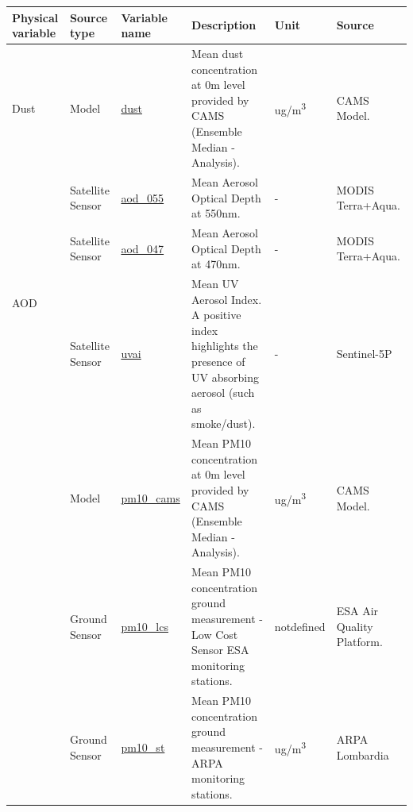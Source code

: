 \begin{center}
\setlength{\arrayrulewidth}{1.5pt}
\begin{longtable}{ |p{2.3cm}|p{1.5cm}|p{2.3cm}|p{4cm}|p{1.2cm}|p{2.3cm}| } 
\hline
\textbf{Physical variable} & \textbf{Source type}  & \textbf{Variable name}  & \textbf{Description}  & \textbf{Unit}  & \textbf{Source}\\ 
\hline
\multirow{1}{4em}{Dust} & Model  & \underline{dust} & Mean dust concentration at 0m level provided by CAMS (Ensemble Median - Analysis).\par & ug/m\textsuperscript{3} & CAMS Model.\\ \hline

\multirow{3}{4em}{AOD} & Satellite \newline Sensor  & \underline{aod\_055} & Mean Aerosol Optical Depth at 550nm.\par & - & MODIS Terra+Aqua.\\ 
& Satellite \newline Sensor  & \underline{aod\_047} &  Mean Aerosol Optical Depth at 470nm.\par & - & MODIS Terra+Aqua.\\ 
& Satellite \newline Sensor & \underline{uvai} &  Mean UV Aerosol Index. A positive index highlights the presence of UV absorbing aerosol (such as smoke/dust). \par & - & Sentinel-5P\\ \hline
\pagebreak
\hline
\multirow{3}{4em}{PM10} & Model  & \underline{pm10\_cams} & Mean PM10 concentration at 0m level provided by CAMS  (Ensemble Median - Analysis).\par & ug/m\textsuperscript{3} & CAMS Model.\\ 
& Ground \newline Sensor  & \underline{pm10\_lcs} &  Mean PM10 concentration ground measurement - Low Cost Sensor ESA monitoring stations.\par & not\newline defined & ESA Air Quality Platform.\\ 
& Ground \newline Sensor & \underline{pm10\_st} &  Mean PM10 concentration ground measurement - ARPA monitoring stations. \par & ug/m\textsuperscript{3} & ARPA \newline Lombardia\\ \hline


\end{longtable}
\end{center}
